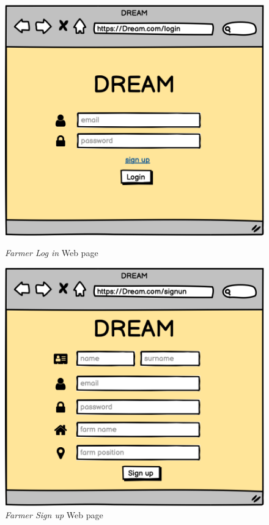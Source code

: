 \begin{figure}[H]
    \begin{minipage}{0.5\textwidth}
        \centering
        \includegraphics[width=1\textwidth]{mockups/FLogIn.png}
        \caption{\emph{Farmer Log in} Web page}
        \label{fig:mockupLogin}
    \end{minipage}\hfill
    \begin{minipage}{0.49\textwidth}
        \centering
        \includegraphics[width=1\textwidth]{mockups/FSignUp.png}
        \caption{\emph{Farmer Sign up} Web page}
        \label{fig:smockupSignUp}
    \end{minipage}
\end{figure}

